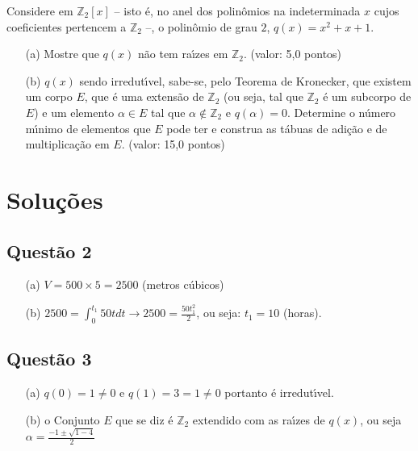 \documentclass{report}
\begin{document}
Considere em $\mathbb Z_2[x]$ – isto \'e, no anel dos polinômios na indeterminada $x$ cujos coeficientes pertencem a $\mathbb Z_2$ –, o polinômio de grau $2$, $q (x) = x^2 + x + 1$.

\begin{enumerate}

\item[(a)] Mostre que $q(x)$ n\~ao tem ra\'\i zes em $\mathbb Z_2$. (valor: 5,0 pontos)

\item[(b)] $q(x)$ sendo irredut\'\i vel, sabe-se, pelo Teorema de Kronecker, que existem um corpo $E$, que \'e uma extens\~ao de $\mathbb Z_2$ (ou seja, tal que $\mathbb Z_2$ \'e um subcorpo de $E$) e um elemento $\alpha \in E$ tal que $\alpha \notin \mathbb Z_2$ e $q(\alpha) = 0$. Determine o n\'umero m\'\i nimo de elementos que $E$ pode ter e construa as t\'abuas de adi\c c\~ao e de multiplica\c c\~ao em $E$. (valor: 15,0 pontos)

\end{enumerate}

\section{\color{red} Solu\c c\~oes}


\subsection{\color{red} Quest\~ao 2}

\begin{enumerate}

\item[(a)] $V=500\times 5=2500$ (metros c\'ubicos)

\item[(b)] $2500=\displaystyle \int_0^{t_1} 50 t dt \longrightarrow 2500=\frac{50t_1^2}{2}$, ou seja: $t_1=10$ (horas).

\end{enumerate}

\subsection{\color{red} Quest\~ao 3}

\begin{enumerate}

\item[(a)] $q(0)=1\neq 0$ e $q(1)=3=1\neq 0$ portanto \'e irredut\'\i vel.

\item[(b)] o Conjunto $E$ que se diz \'e $\mathbb Z_2$ extendido com as ra\'\i zes de $q(x)$, ou seja $\alpha=\displaystyle\frac{-1\pm \sqrt{1-4}}{2}$

\end{enumerate}
\end{document}
